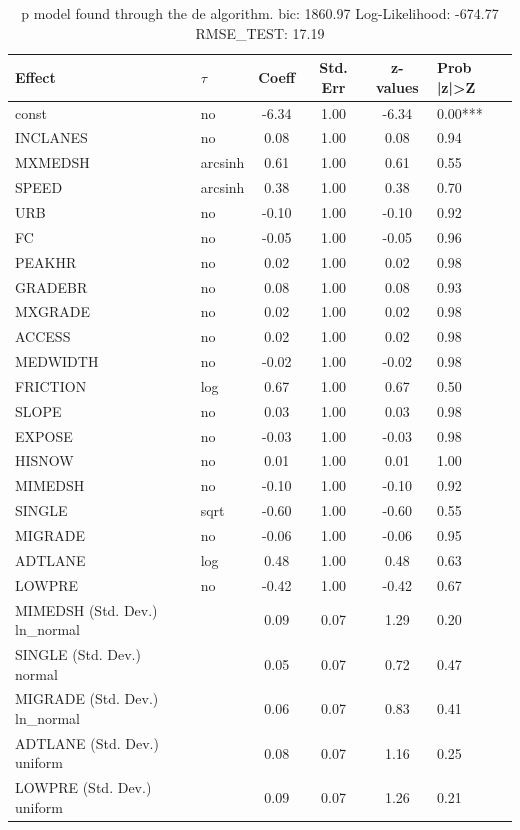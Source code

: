 \begin{table}
	\caption{p model found through the de algorithm. bic: 1860.97 Log-Likelihood: -674.77 RMSE_TEST: 17.19}
	\begin{center}
		\begin{tabular}{|l|l|c|c|c|l|}
			\hline
			Effect & $\tau$ & Coeff & Std. Err & z-values & Prob |z|>Z \\
			\hline
			const & no & -6.34 & 1.00 & -6.34 & 0.00*** \\
			\hline
			INCLANES & no & 0.08 & 1.00 & 0.08 & 0.94 \\
			\hline
			MXMEDSH & arcsinh & 0.61 & 1.00 & 0.61 & 0.55 \\
			\hline
			SPEED & arcsinh & 0.38 & 1.00 & 0.38 & 0.70 \\
			\hline
			URB & no & -0.10 & 1.00 & -0.10 & 0.92 \\
			\hline
			FC & no & -0.05 & 1.00 & -0.05 & 0.96 \\
			\hline
			PEAKHR & no & 0.02 & 1.00 & 0.02 & 0.98 \\
			\hline
			GRADEBR & no & 0.08 & 1.00 & 0.08 & 0.93 \\
			\hline
			MXGRADE & no & 0.02 & 1.00 & 0.02 & 0.98 \\
			\hline
			ACCESS & no & 0.02 & 1.00 & 0.02 & 0.98 \\
			\hline
			MEDWIDTH & no & -0.02 & 1.00 & -0.02 & 0.98 \\
			\hline
			FRICTION & log & 0.67 & 1.00 & 0.67 & 0.50 \\
			\hline
			SLOPE & no & 0.03 & 1.00 & 0.03 & 0.98 \\
			\hline
			EXPOSE & no & -0.03 & 1.00 & -0.03 & 0.98 \\
			\hline
			HISNOW & no & 0.01 & 1.00 & 0.01 & 1.00 \\
			\hline
			MIMEDSH & no & -0.10 & 1.00 & -0.10 & 0.92 \\
			\hline
			SINGLE & sqrt & -0.60 & 1.00 & -0.60 & 0.55 \\
			\hline
			MIGRADE & no & -0.06 & 1.00 & -0.06 & 0.95 \\
			\hline
			ADTLANE & log & 0.48 & 1.00 & 0.48 & 0.63 \\
			\hline
			LOWPRE & no & -0.42 & 1.00 & -0.42 & 0.67 \\
			\hline
			MIMEDSH (Std. Dev.) ln_normal &  & 0.09 & 0.07 & 1.29 & 0.20 \\
			\hline
			SINGLE (Std. Dev.) normal &  & 0.05 & 0.07 & 0.72 & 0.47 \\
			\hline
			MIGRADE (Std. Dev.) ln_normal &  & 0.06 & 0.07 & 0.83 & 0.41 \\
			\hline
			ADTLANE (Std. Dev.) uniform &  & 0.08 & 0.07 & 1.16 & 0.25 \\
			\hline
			LOWPRE (Std. Dev.) uniform &  & 0.09 & 0.07 & 1.26 & 0.21 \\
			\hline
		\end{tabular}
	\end{center}
\end{table}